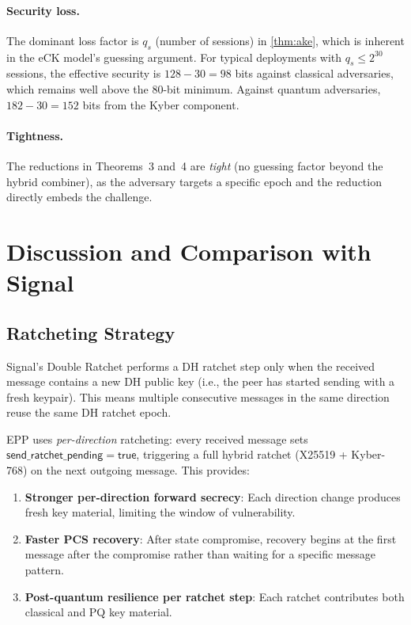 \documentclass[11pt,a4paper]{article}
\theoremstyle{definition}
\theoremstyle{remark}
\begin{document}
\paragraph{Security loss.}
The dominant loss factor is $q_s$ (number of sessions) in
\cref{thm:ake}, which is inherent in the eCK model's guessing
argument.  For typical deployments with $q_s \leq 2^{30}$ sessions,
the effective security is $128 - 30 = 98$ bits against classical
adversaries, which remains well above the 80-bit minimum.
Against quantum adversaries, $182 - 30 = 152$ bits from the Kyber
component.

\paragraph{Tightness.}
The reductions in Theorems~3 and~4 are \emph{tight} (no guessing
factor beyond the hybrid combiner), as the adversary targets a specific
epoch and the reduction directly embeds the challenge.


\section{Discussion and Comparison with Signal}
\label{sec:discussion}

\subsection{Ratcheting Strategy}

Signal's Double Ratchet performs a DH ratchet step only when the received
message contains a new DH public key (i.e., the peer has started sending
with a fresh keypair).  This means multiple consecutive messages in the
same direction reuse the same DH ratchet epoch.

EPP uses \emph{per-direction} ratcheting: every received message sets
$\mathsf{send\_ratchet\_pending} = \mathsf{true}$, triggering a full
hybrid ratchet (X25519 + Kyber-768) on the next outgoing message.  This
provides:

\begin{enumerate}[nosep]
  \item \textbf{Stronger per-direction forward secrecy}: Each direction
        change produces fresh key material, limiting the window of
        vulnerability.
  \item \textbf{Faster PCS recovery}: After state compromise, recovery
        begins at the first message after the compromise rather than
        waiting for a specific message pattern.
  \item \textbf{Post-quantum resilience per ratchet step}: Each ratchet
        contributes both classical and PQ key material.
\end{enumerate}
\end{document}
